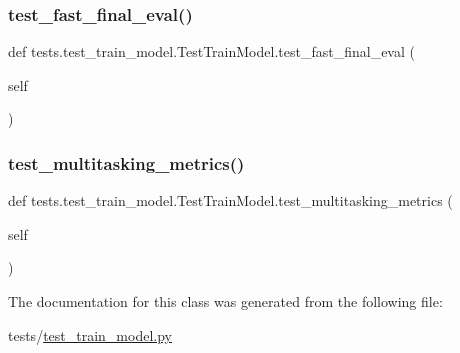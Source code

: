 \subsubsection{\texorpdfstring{test\+\_\+fast\+\_\+final\+\_\+eval()}{test\_fast\_final\_eval()}}
{\footnotesize\ttfamily def tests.\+test\+\_\+train\+\_\+model.\+Test\+Train\+Model.\+test\+\_\+fast\+\_\+final\+\_\+eval (\begin{DoxyParamCaption}\item[{}]{self }\end{DoxyParamCaption})}

\mbox{\label{classtests_1_1test__train__model_1_1TestTrainModel_a099516526ea34f8ad88bf921e94c01b9}} 
\subsubsection{\texorpdfstring{test\+\_\+multitasking\+\_\+metrics()}{test\_multitasking\_metrics()}}
{\footnotesize\ttfamily def tests.\+test\+\_\+train\+\_\+model.\+Test\+Train\+Model.\+test\+\_\+multitasking\+\_\+metrics (\begin{DoxyParamCaption}\item[{}]{self }\end{DoxyParamCaption})}



The documentation for this class was generated from the following file\+:\begin{DoxyCompactItemize}
\item 
tests/\hyperlink{test__train__model_8py}{test\+\_\+train\+\_\+model.\+py}\end{DoxyCompactItemize}
